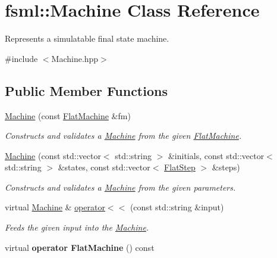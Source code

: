 \hypertarget{classfsml_1_1Machine}{\section{fsml\-:\-:Machine Class Reference}
\label{classfsml_1_1Machine}
}


Represents a simulatable final state machine.  




{\ttfamily \#include $<$Machine.\-hpp$>$}

\subsection*{Public Member Functions}
\begin{DoxyCompactItemize}
\item 
\hyperlink{classfsml_1_1Machine_a0666d3b6834e968bd0fe1461164de7ef}{Machine} (const \hyperlink{structfsml_1_1FlatMachine}{Flat\-Machine} \&fm)
\begin{DoxyCompactList}\small\item\em Constructs and validates a \hyperlink{classfsml_1_1Machine}{Machine} from the given \hyperlink{structfsml_1_1FlatMachine}{Flat\-Machine}. \end{DoxyCompactList}\item 
\hyperlink{classfsml_1_1Machine_a0c60fab103e0e65343c729ed3502ebac}{Machine} (const std\-::vector$<$ std\-::string $>$ \&initials, const std\-::vector$<$ std\-::string $>$ \&states, const std\-::vector$<$ \hyperlink{structfsml_1_1FlatStep}{Flat\-Step} $>$ \&steps)
\begin{DoxyCompactList}\small\item\em Constructs and validates a \hyperlink{classfsml_1_1Machine}{Machine} from the given parameters. \end{DoxyCompactList}\item 
virtual \hyperlink{classfsml_1_1Machine}{Machine} \& \hyperlink{classfsml_1_1Machine_a4c02303acf2c3bd89ffc6ceda604b02d}{operator$<$$<$} (const std\-::string \&input)
\begin{DoxyCompactList}\small\item\em Feeds the given input into the \hyperlink{classfsml_1_1Machine}{Machine}. \end{DoxyCompactList}\item 
\hypertarget{classfsml_1_1Machine_a146384b88619887f03613f439781e9e0}{virtual {\bfseries operator Flat\-Machine} () const }\label{classfsml_1_1Machine_a146384b88619887f03613f439781e9e0}


\end{DoxyCompactItemize}

